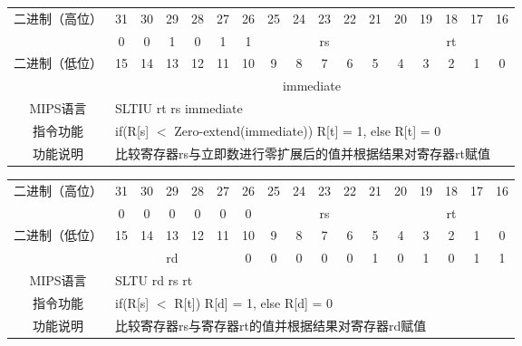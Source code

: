 \clearpage

\begin{table}
\begin{tabular}{|c|c|c|c|c|c|c|c|c|c|c|c|c|c|c|c|c|}
\hline
\multirow{2}{*}{二进制（高位）} &
31&30&29&28&27&26&25&24&23&22&21&20&19&18&17&16\\
\cline{2-17}
&0&0&1&0&1&1&
\multicolumn{5}{c|}{rs}&
\multicolumn{5}{c|}{rt}\\
\hline
\multirow{2}{*}{二进制（低位）} &
15&14&13&12&11&10&9&8&7&6&5&4&3&2&1&0\\
\cline{2-17}
&
\multicolumn{16}{c|}{immediate}\\
\hline
MIPS语言&
\multicolumn{16}{l|}{SLTIU rt rs immediate}\\
\hline
指令功能&
\multicolumn{16}{l|}{if(R[s] $<$ Zero-extend(immediate)) R[t] = 1, else R[t] = 0}\\
\hline
功能说明&
\multicolumn{16}{l|}{比较寄存器rs与立即数进行零扩展后的值并根据结果对寄存器rt赋值}\\
\hline
\end{tabular}
\end{table}

\begin{table}
\begin{tabular}{|c|c|c|c|c|c|c|c|c|c|c|c|c|c|c|c|c|}
\hline
\multirow{2}{*}{二进制（高位）} &
31&30&29&28&27&26&25&24&23&22&21&20&19&18&17&16\\
\cline{2-17}
&0&0&0&0&0&0&
\multicolumn{5}{c|}{rs}&
\multicolumn{5}{c|}{rt}\\
\hline
\multirow{2}{*}{二进制（低位）} &
15&14&13&12&11&10&9&8&7&6&5&4&3&2&1&0\\
\cline{2-17}
&
\multicolumn{5}{c|}{rd}&
0&0&0&0&0&1&0&1&0&1&1\\
\hline
MIPS语言&
\multicolumn{16}{l|}{SLTU rd rs rt}\\
\hline
指令功能&
\multicolumn{16}{l|}{if(R[s] $<$ R[t]) R[d] = 1, else R[d] = 0}\\
\hline
功能说明&
\multicolumn{16}{l|}{比较寄存器rs与寄存器rt的值并根据结果对寄存器rd赋值}\\
\hline
\end{tabular}
\end{table}

